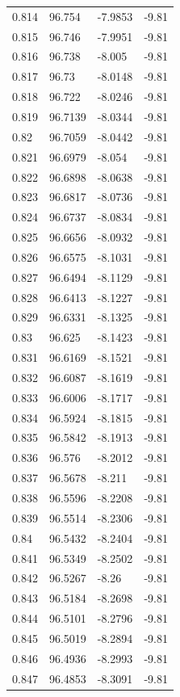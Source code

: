 \begin{tabular}{llll}
0.814 & 96.754 & -7.9853 & -9.81 \\
0.815 & 96.746 & -7.9951 & -9.81 \\
0.816 & 96.738 & -8.005 & -9.81 \\
0.817 & 96.73 & -8.0148 & -9.81 \\
0.818 & 96.722 & -8.0246 & -9.81 \\
0.819 & 96.7139 & -8.0344 & -9.81 \\
0.82 & 96.7059 & -8.0442 & -9.81 \\
0.821 & 96.6979 & -8.054 & -9.81 \\
0.822 & 96.6898 & -8.0638 & -9.81 \\
0.823 & 96.6817 & -8.0736 & -9.81 \\
0.824 & 96.6737 & -8.0834 & -9.81 \\
0.825 & 96.6656 & -8.0932 & -9.81 \\
0.826 & 96.6575 & -8.1031 & -9.81 \\
0.827 & 96.6494 & -8.1129 & -9.81 \\
0.828 & 96.6413 & -8.1227 & -9.81 \\
0.829 & 96.6331 & -8.1325 & -9.81 \\
0.83 & 96.625 & -8.1423 & -9.81 \\
0.831 & 96.6169 & -8.1521 & -9.81 \\
0.832 & 96.6087 & -8.1619 & -9.81 \\
0.833 & 96.6006 & -8.1717 & -9.81 \\
0.834 & 96.5924 & -8.1815 & -9.81 \\
0.835 & 96.5842 & -8.1913 & -9.81 \\
0.836 & 96.576 & -8.2012 & -9.81 \\
0.837 & 96.5678 & -8.211 & -9.81 \\
0.838 & 96.5596 & -8.2208 & -9.81 \\
0.839 & 96.5514 & -8.2306 & -9.81 \\
0.84 & 96.5432 & -8.2404 & -9.81 \\
0.841 & 96.5349 & -8.2502 & -9.81 \\
0.842 & 96.5267 & -8.26 & -9.81 \\
0.843 & 96.5184 & -8.2698 & -9.81 \\
0.844 & 96.5101 & -8.2796 & -9.81 \\
0.845 & 96.5019 & -8.2894 & -9.81 \\
0.846 & 96.4936 & -8.2993 & -9.81 \\
0.847 & 96.4853 & -8.3091 & -9.81 \\

\end{tabular}
